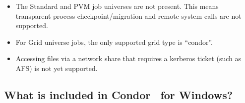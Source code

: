 \begin{itemize}

\item The Standard and PVM job universes are not present.  This means
transparent process checkpoint/migration and remote system calls are
not supported.

\item For Grid universe jobs, the only supported grid type is
``condor''.

\item Accessing files via a network share that requires a kerberos ticket
(such as AFS) is not yet supported.

\end{itemize}

\subsection{What is included in Condor \VersionNotice\ for Windows?}

